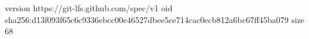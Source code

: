 version https://git-lfs.github.com/spec/v1
oid sha256:d13f093f65c6c9336ebcc00e46527dbee5ce714cac0ecb812a6bc67ff45ba079
size 68
